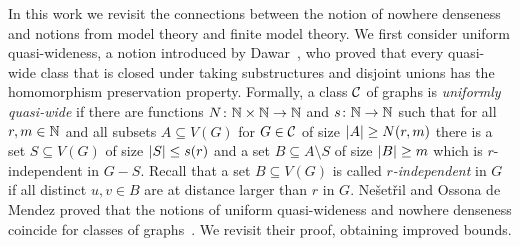 \begin{comment}
These alternative characterizations have been very useful in 
the design of efficient algorithms. For instance, 
the {\sc{Subgraph Isomorphism}} and {\sc{Homomorphism}} problems 
are fixed-parameter tractable on any nowhere dense
class, parameterized by the size of the pattern graph~\cite{nevsetvril2010first}
and so is the {\sc Distance-$r$ Dominating Set} problem, parameterized
by the size of the solution~\cite{DawarK09}. In fact, 
the {\sc Distance-$r$ Dominating Set} problem admits
polynomial kernels~\cite{siebertz2016polynomial} and even 
almost linear kernels on nowhere dense classes of 
graphs~\cite{eickmeyer2016neighborhood}
(see also~\cite{drange2016kernelization} for the case $r=1$). 
It was shown in~\cite{grohe2014deciding}
that every first-order definable problem can be decided in
almost linear time on any nowhere dense graph class.

It is a natural question to ask for the most general classes of graphs
which admit efficient solutions for certain problems, or to 
classify them into tractable and intractable classes. It was shown 
that for the first-order model-checking problem~\cite{dvovrak2013testing} and for
the {\sc Distance-$r$ Dominating Set} problem~\cite{drange2016kernelization} 
the dividing line for algorithmic tractability 
on subgraph closed classes of graphs is exactly between the
nowhere dense and somewhere dense graph classes. 
\end{comment}


In this work we revisit the connections between the notion of nowhere 
denseness and notions from  model theory and finite model theory.
We first consider uniform quasi-wideness, a
notion  introduced by Dawar~\cite{dawar2010homomorphism}, who 
proved that every quasi-wide class that is closed under taking substructures
and disjoint unions has the homomorphism preservation property. 
Formally, a class $\mathcal{C}$ of graphs is \emph{uniformly quasi-wide} if there are
functions $N\colon \mathbb{N}\times\mathbb{N}\rightarrow \mathbb{N}$ and $s\colon \mathbb{N}\rightarrow \mathbb{N}$ such
that for all $r,m\in \mathbb{N}$ and all subsets $A\subseteq V(G)$ for
$G\in \mathcal{C}$ of size $\left\lvert A\right\rvert\geq N(r,m)$ there is a set
$S\subseteq V(G)$ of size $\left\lvert S\right\rvert\leq s(r)$ and a set
$B\subseteq A\setminus S$ of size $\left\lvert B\right\rvert\geq m$ which is $r$-independent in
$G-S$. Recall that a set $B\subseteq V(G)$ is called {\em{$r$-independent}} in $G$ if all
distinct $u,v\in B$ are at distance 
larger than $r$ in $G$.
 Ne\v{s}et\v{r}il and Ossona de Mendez proved that
the notions of uniform quasi-wideness and nowhere denseness coincide for 
classes of graphs~\cite{nevsetvril2011nowhere}. We revisit their proof, obtaining improved bounds.


